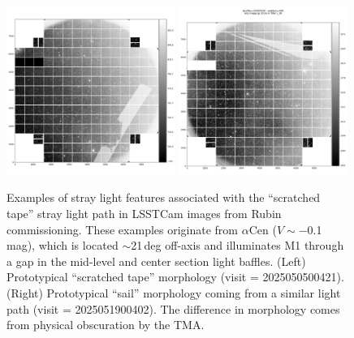 \documentclass[SE,lsstdraft,authoryear,toc]{lsstdoc}
\begin{document}
\begin{figure}[t!]
    \includegraphics[width=0.49\textwidth]{figures/lsstcam_focal_plane_mosaic_2025-05-05_000421.jpg}
    \includegraphics[width=0.49\textwidth, clip, trim={0.5cm 0 0 0}]{figures/lsstcam_focal_plane_mosaic_2025-05-19_000402.jpg}
    \caption{\label{fig:tape} Examples of stray light features associated with the ``scratched tape'' stray light path in LSSTCam images from Rubin commissioning. These examples originate from $\alpha$Cen ($V \sim -$0.1\,mag), which is located $\sim$21\,deg off-axis and illuminates M1 through a gap in the mid-level and center section light baffles. (Left) Prototypical ``scratched tape'' morphology (visit = 2025050500421). (Right) Prototypical ``sail'' morphology coming from a similar light path (visit = 2025051900402). The difference in morphology comes from physical obscuration by the TMA.}
\end{figure}
\end{document}

